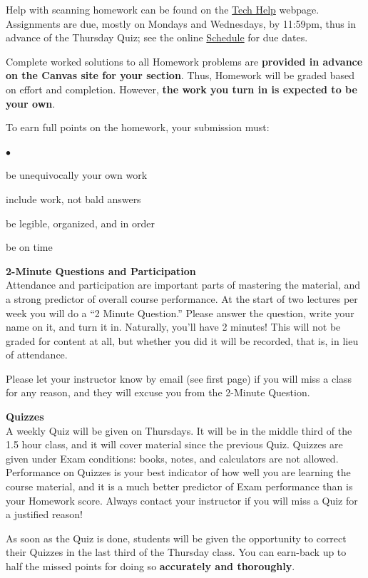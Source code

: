 \documentclass[12pt]{article}
\renewcommand{\emph}[1]{\textsf{\textbf{#1}}}
\newcommand{\localhead}[1]{\par\smallskip\textbf{#1} \smallskip\nobreak\\}%
\def\heading#1{\localhead{\large\emph{#1}}}
\newenvironment{clist}%
{\bgroup\parskip 0pt\begin{list}{$\bullet$}{\partopsep 4pt\topsep 0pt\itemsep -2pt}}%
{\end{list}\egroup}%
\begin{document}
Help with scanning homework can be found on the \href{https://uaf-math.github.io/calc2/techHelp.html}{Tech Help} webpage.  Assignments are due, mostly on Mondays and Wednesdays, by 11:59pm, thus in advance of the Thursday Quiz; see the online \href{https://uaf-math.github.io/calc2/assets/general/S26/inperson/schedule.pdf}{Schedule} for due dates.  

Complete worked solutions to all Homework problems are \textbf{provided in advance on the Canvas site for your section}.  Thus, Homework will be graded based on {effort} and {completion}.  However, \textbf{the work you turn in is expected to be your own}.  

To earn full points on the homework, your submission must:
\vskip -20pt\strut
\begin{clist}
\item be unequivocally your own work
\item include work, not bald answers
\item be legible, organized, and in order
\item be on time
\end{clist}

\heading{2-Minute Questions and Participation}
Attendance and participation are important parts of mastering the material, and a strong predictor of overall course performance.  At the start of two lectures per week you will do a ``2 Minute Question.''  Please answer the question, write your name on it, and turn it in.  Naturally, you'll have 2 minutes!  This will not be graded for content at all, but whether you did it will be recorded, that is, in lieu of attendance.

Please let your instructor know by email (see first page) if you will miss a class for any reason, and they will excuse you from the 2-Minute Question.

\heading{Quizzes}
A weekly Quiz will be given on Thursdays.  It will be in the middle third of the 1.5 hour class, and it will cover material since the previous Quiz.  Quizzes are given under Exam conditions: books, notes, and calculators are not allowed.  Performance on Quizzes is your best indicator of how well you are learning the course material, and it is a much better predictor of Exam performance than is your Homework score.  Always contact your instructor if you will miss a Quiz for a justified reason!

As soon as the Quiz is done, students will be given the opportunity to correct their Quizzes in the last third of the Thursday class.  You can earn-back up to half the missed points for doing so \textbf{accurately and thoroughly}.
\end{document}
